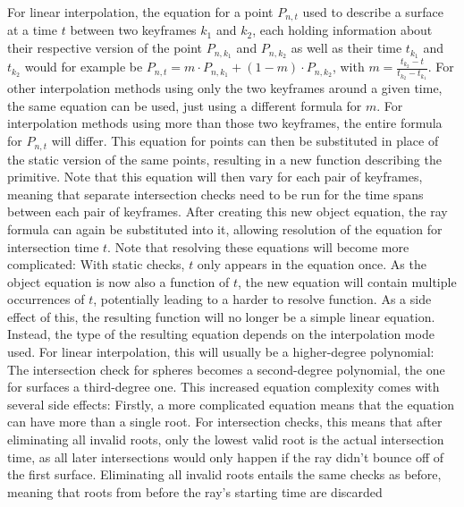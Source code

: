 For linear interpolation,
the equation for a point \(P_{n, t}\) used to describe a surface at a time \(t\) between two keyframes \(k_1\) and \(k_2\),
each holding information about their respective version of the point \(P_{n, k_1}\) and \(P_{n, k_2}\)
as well as their time \(t_{k_1}\) and \(t_{k_2}\)
would for example be \(P_{n, t} = m \cdot P_{n, k_1} + (1-m) \cdot P_{n, k_2}\),
with \(m = \frac{t_{k_2} - t}{t_{k_2} - t_{k_1}}\).
For other interpolation methods using only the two keyframes around a given time,
the same equation can be used, just using a different formula for \(m\).
For interpolation methods using more than those two keyframes,
the entire formula for \(P_{n, t}\) will differ.
\newline
This equation for points can then be substituted in place of the static version of the same points,
resulting in a new function describing the primitive.
Note that this equation will then vary for each pair of keyframes,
meaning that separate intersection checks need to be run for the time spans between each pair of keyframes.
\newline
After creating this new object equation, the ray formula can again be substituted into it,
allowing resolution of the equation for intersection time \(t\).
Note that resolving these equations will become more complicated:
With static checks, \(t\) only appears in the equation once.
As the object equation is now also a function of \(t\),
the new equation will contain multiple occurrences of \(t\),
potentially leading to a harder to resolve function.
\newline
As a side effect of this,
the resulting function will no longer be a simple linear equation.
Instead, the type of the resulting equation depends on the interpolation mode used.
For linear interpolation, this will usually be a higher-degree polynomial:
The intersection check for spheres becomes a second-degree polynomial,
the one for surfaces a third-degree one.
\newline
This increased equation complexity comes with several side effects:
Firstly, a more complicated equation means that the equation can have more than a single root.
For intersection checks, this means that after eliminating all invalid roots,
only the lowest valid root is the actual intersection time,
as all later intersections would only happen if the ray didn't bounce off of the first surface.
\newline
Eliminating all invalid roots entails the same checks as before,
meaning that roots from before the ray's starting time are discarded
